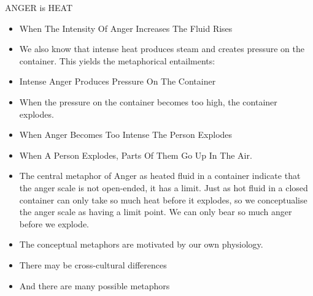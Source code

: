 \begin{frame}[allowframebreaks]{ANGER is HEAT}
\begin{itemize}
\item When The Intensity Of Anger Increases The Fluid Rises
\begin{exe}
  \ex {}
  \ex {}
  \ex {}
  \ex {}
  \ex {}
\end{exe}
\framebreak
\item We also know that intense heat produces steam and creates pressure on the
container. This yields the metaphorical entailments:
\item Intense Anger Produces Pressure On The Container
  \begin{exe}
    \ex {}
    \ex {}
    \ex {}
    \ex {}
    \ex {}
    \ex {}
    \ex {}
\end{exe}
\framebreak
\item  When the pressure on the container becomes too high, the container explodes.
\item When Anger Becomes Too Intense The Person Explodes
  \begin{exe}
    \ex {}
  \ex {}
  \ex {}
  \ex {}
  \ex {}
  \ex {}
\end{exe}
\framebreak
\item When A Person Explodes, Parts Of Them Go Up In The Air.
  \begin{exe}
  \ex {}
  \ex {}
  \ex {}
  \ex {}
  \ex {}
\end{exe}

\framebreak

\item The central metaphor of Anger as heated fluid in a container indicate
that the anger scale is not open-ended, it has a limit. Just as hot
fluid in a closed container can only take so much heat before it
explodes, so we conceptualise the anger scale as having a limit
point. We can only bear so much anger before we explode.
\item The conceptual metaphors are motivated by our own physiology.
\item There may be cross-cultural differences
\item And there are many possible metaphors


\end{itemize}
\end{frame}
